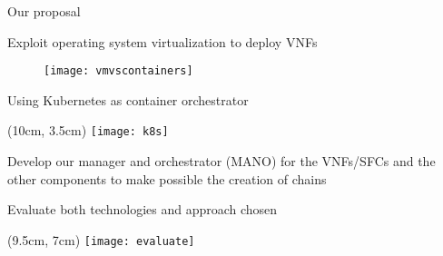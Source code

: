 \begin{frame}{Our proposal}

  \vspace*{-0.2cm}

  Exploit operating system virtualization to deploy VNFs

  \begin{figure}
    \centering
    \texttt{[image: vmvscontainers]}
  \end{figure}

  Using Kubernetes as container orchestrator

  \vspace{1cm}

  \begin{textblock*}{1cm}(10cm, 3.5cm)
    \texttt{[image: k8s]}
  \end{textblock*}

  Develop our manager and orchestrator (MANO) for the VNFs/SFCs and the other
  components to make possible the creation of chains

  \vspace{1cm}

  Evaluate both technologies and approach chosen

  \vspace{1cm}

  \begin{textblock*}{1cm}(9.5cm, 7cm)
    \texttt{[image: evaluate]}
  \end{textblock*}

\end{frame}